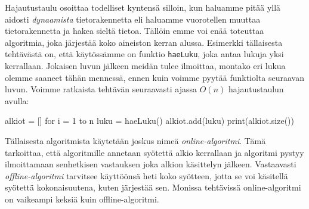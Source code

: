 Hajautustaulu osoittaa todelliset kyntensä silloin,
kun haluamme pitää yllä aidosti \emph{dynaamista}
tietorakennetta eli haluamme vuorotellen muuttaa
tietorakennetta ja hakea sieltä tietoa.
Tällöin emme voi enää toteuttaa algoritmia,
joka järjestää koko aineiston kerran alussa.
Esimerkki tällaisesta tehtävästä on,
että käytössämme on funktio \texttt{haeLuku},
joka antaa lukuja yksi kerrallaan.
Jokaisen luvun jälkeen meidän tulee ilmoittaa,
montako eri lukua olemme saaneet tähän mennessä,
ennen kuin voimme pyytää funktiolta seuraavan luvun.
Voimme ratkaista tehtävän seuraavasti ajassa $O(n)$
hajautustaulun avulla:

\begin{code}
alkiot = []
for i = 1 to n
    luku = haeLuku()
    alkiot.add(luku)
    print(alkiot.size())
\end{code}


Tällaisesta algoritmista käytetään joskus nimeä
\emph{online-algoritmi}.
Tämä tarkoittaa, että algoritmille annetaan syötettä
alkio kerrallaan ja algoritmi pystyy ilmoittamaan senhetkisen
vastauksen joka alkion käsittelyn jälkeen.
Vastaavasti \emph{offline-algoritmi} tarvitsee
käyttöönsä heti koko syötteen,
jotta se voi käsitellä syötettä kokonaisuutena,
kuten järjestää sen.
Monissa tehtävissä online-algoritmi on vaikeampi
keksiä kuin offline-algoritmi.
